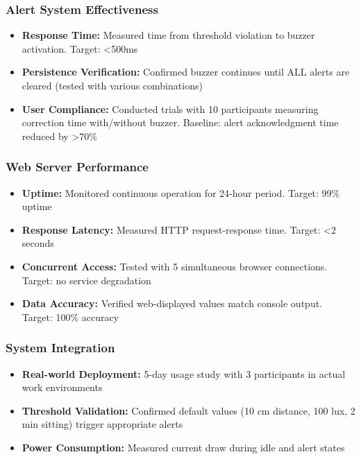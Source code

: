 \documentclass[12pt,a4paper]{article}
\begin{document}
\subsubsection{Alert System Effectiveness}

\begin{itemize}
\item \textbf{Response Time:} Measured time from threshold violation to buzzer activation. Target: <500ms

\item \textbf{Persistence Verification:} Confirmed buzzer continues until ALL alerts are cleared (tested with various combinations)

\item \textbf{User Compliance:} Conducted trials with 10 participants measuring correction time with/without buzzer. Baseline: alert acknowledgment time reduced by >70\%
\end{itemize}

\subsubsection{Web Server Performance}

\begin{itemize}
\item \textbf{Uptime:} Monitored continuous operation for 24-hour period. Target: 99\% uptime

\item \textbf{Response Latency:} Measured HTTP request-response time. Target: <2 seconds

\item \textbf{Concurrent Access:} Tested with 5 simultaneous browser connections. Target: no service degradation

\item \textbf{Data Accuracy:} Verified web-displayed values match console output. Target: 100\% accuracy
\end{itemize}

\subsubsection{System Integration}

\begin{itemize}
\item \textbf{Real-world Deployment:} 5-day usage study with 3 participants in actual work environments

\item \textbf{Threshold Validation:} Confirmed default values (10 cm distance, 100 lux, 2 min sitting) trigger appropriate alerts

\item \textbf{Power Consumption:} Measured current draw during idle and alert states
\end{itemize}
\end{document}

